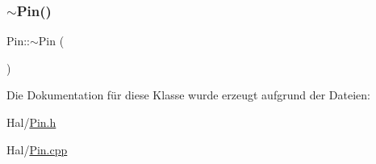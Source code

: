 \hypertarget{class_pin_a462c14c45d3d653731dde638aa6e7bb7}{}\label{class_pin_a462c14c45d3d653731dde638aa6e7bb7} 
\subsubsection{\texorpdfstring{$\sim$\+Pin()}{~Pin()}}
{\footnotesize\ttfamily Pin\+::$\sim$\+Pin (\begin{DoxyParamCaption}{ }\end{DoxyParamCaption})\hspace{0.3cm}{\ttfamily [virtual]}}



Die Dokumentation für diese Klasse wurde erzeugt aufgrund der Dateien\+:\begin{DoxyCompactItemize}
\item 
Hal/\hyperlink{_pin_8h}{Pin.\+h}\item 
Hal/\hyperlink{_pin_8cpp}{Pin.\+cpp}\end{DoxyCompactItemize}
